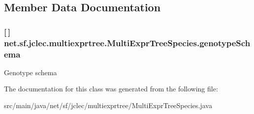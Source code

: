 \subsection{Member Data Documentation}
\hypertarget{classnet_1_1sf_1_1jclec_1_1multiexprtree_1_1_multi_expr_tree_species_a32511c3d9de8c71c2f8e3d78000d83d0}{
\subsubsection[{genotype\-Schema}]{ \mbox{[}$\,$\mbox{]} net.\-sf.\-jclec.\-multiexprtree.\-Multi\-Expr\-Tree\-Species.\-genotype\-Schema\hspace{0.3cm}{\ttfamily [protected]}}}\label{classnet_1_1sf_1_1jclec_1_1multiexprtree_1_1_multi_expr_tree_species_a32511c3d9de8c71c2f8e3d78000d83d0}
Genotype schema 

The documentation for this class was generated from the following file\-:\begin{DoxyCompactItemize}
\item 
src/main/java/net/sf/jclec/multiexprtree/Multi\-Expr\-Tree\-Species.\-java\end{DoxyCompactItemize}

